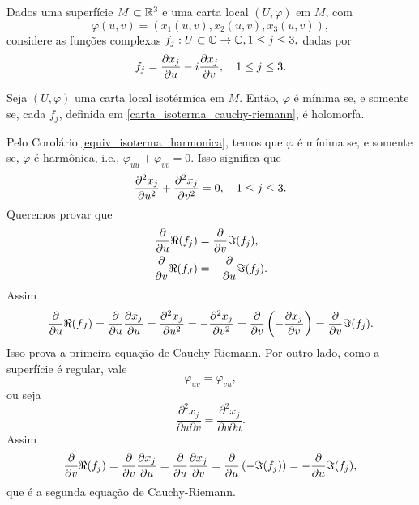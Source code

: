 Dados uma superfície $M \subset \mathbb{R}^3$ e uma carta local $(U, \varphi)$ em $M$, com
\begin{equation*}
\varphi(u,v) = (x_1(u,v), x_2(u,v), x_3(u,v)),
\end{equation*}
considere as funções complexas $f_j: U \subset \mathbb{C} \rightarrow \mathbb{C}, 1 \leq j \leq 3,$ dadas por
\begin{equation}\label{carta_isoterma_cauchy-riemann}
f_j = \frac{\partial x_j}{\partial u} - i \frac{\partial x_j}{\partial v}, \quad 1 \leq j \leq 3.
\end{equation}

\begin{lema}
	Seja $(U, \varphi)$ uma carta local isotérmica em $M$. Então, $\varphi$ é mínima se, e somente se, cada $f_j$, definida em \eqref{carta_isoterma_cauchy-riemann}, é holomorfa.
\end{lema}

\begin{demonstracao}
	Pelo Corolário \ref{equiv_isoterma_harmonica}, temos que $\varphi$ é mínima se, e somente se, $\varphi$ é harmônica, i.e., $\varphi_{uu} + \varphi_{vv} = 0$. Isso significa que
	\begin{equation*}
	\frac{\partial^2 x_j}{\partial u^2} + \frac{\partial^2 x_j}{\partial v^2} = 0, \quad 1 \leq j \leq 3.
	\end{equation*}
	Queremos provar que
	\begin{align*}
	\frac{\partial}{\partial u} \Re(f_j) &= \frac{\partial}{\partial v} \Im(f_j),\\
	\frac{\partial}{\partial v} \Re(f_J) &= - \frac{\partial}{\partial u} \Im(f_j).
	\end{align*}
	Assim
	\begin{equation*}
	\frac{\partial}{\partial u} \Re(f_J) = \frac{\partial}{\partial u} \frac{\partial x_j}{\partial u} = \frac{\partial^2 x_j}{\partial u^2} = - \frac{\partial^2 x_j}{\partial v^2} = \frac{\partial}{\partial v} \left( - \frac{\partial x_j}{\partial v} \right) = \frac{\partial}{\partial v} \Im(f_j).
	\end{equation*}
	Isso prova a primeira equação de Cauchy-Riemann. Por outro lado, como a superfície é regular, vale
	\begin{equation*}
	\varphi_{uv} = \varphi_{vu},
	\end{equation*}
	ou seja
	\begin{equation*}
	\frac{\partial^2 x_j}{\partial u \partial v} = \frac{\partial^2 x_j}{\partial v \partial u}.
	\end{equation*}
	Assim
	\begin{equation*}
	\frac{\partial}{\partial v} \Re(f_j) = \frac{\partial}{\partial v} \frac{\partial x_j}{\partial u} = \frac{\partial}{\partial u} \frac{\partial x_j}{\partial v}
	= \frac{\partial}{\partial u} \left( - \Im(f_j) \right)
	= - \frac{\partial}{\partial u} \Im(f_j),
	\end{equation*}
	que é a segunda equação de Cauchy-Riemann.
\end{demonstracao}

